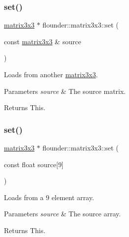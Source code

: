 \subsubsection{\texorpdfstring{set()}{set()}\hspace{0.1cm}{\footnotesize\ttfamily [1/2]}}
{\footnotesize\ttfamily \hyperlink{classflounder_1_1matrix3x3}{matrix3x3} $\ast$ flounder\+::matrix3x3\+::set (\begin{DoxyParamCaption}\item[{const \hyperlink{classflounder_1_1matrix3x3}{matrix3x3} \&}]{source }\end{DoxyParamCaption})}



Loads from another \hyperlink{classflounder_1_1matrix3x3}{matrix3x3}. 


\begin{DoxyParams}{Parameters}
{\em source} & The source matrix. \\
\hline
\end{DoxyParams}
\begin{DoxyReturn}{Returns}
This. 
\end{DoxyReturn}
\mbox{\label{classflounder_1_1matrix3x3_a8afe0392663cacadae79be59c612def4}} 
\subsubsection{\texorpdfstring{set()}{set()}\hspace{0.1cm}{\footnotesize\ttfamily [2/2]}}
{\footnotesize\ttfamily \hyperlink{classflounder_1_1matrix3x3}{matrix3x3} $\ast$ flounder\+::matrix3x3\+::set (\begin{DoxyParamCaption}\item[{const float}]{source\mbox{[}9\mbox{]} }\end{DoxyParamCaption})}



Loads from a 9 element array. 


\begin{DoxyParams}{Parameters}
{\em source} & The source array. \\
\hline
\end{DoxyParams}
\begin{DoxyReturn}{Returns}
This. 
\end{DoxyReturn}
\mbox{\label{classflounder_1_1matrix3x3_adf3b56d6ebbfae9a30ba46b220ca619b}} 
